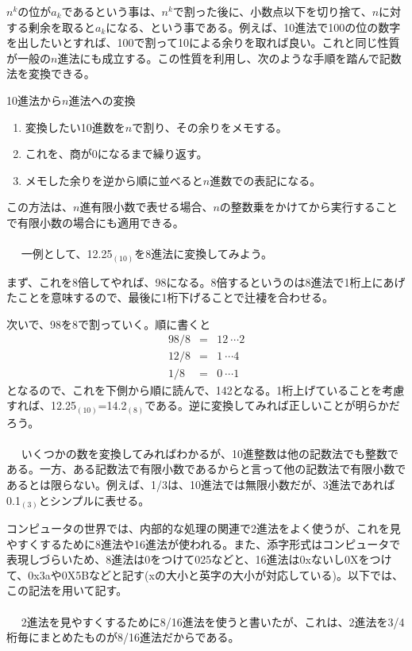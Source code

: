 $n^k$の位が$a_k$であるという事は、$n^k$で割った後に、小数点以下を切り捨て、$n$に対する剰余を取ると$a_k$になる、という事である。例えば、10進法で100の位の数字を出したいとすれば、100で割って10による余りを取れば良い。これと同じ性質が一般の$n$進法にも成立する。この性質を利用し、次のような手順を踏んで記数法を変換できる。
\begin{itembox}[l]{10進法から$n$進法への変換}
\begin{enumerate}
\item 変換したい10進数を$n$で割り、その余りをメモする。
\item これを、商が0になるまで繰り返す。
\item メモした余りを逆から順に並べると$n$進数での表記になる。
\end{enumerate}
\end{itembox}

この方法は、$n$進有限小数で表せる場合、$n$の整数乗をかけてから実行することで有限小数の場合にも適用できる。
\\ \\　
一例として、12.25$_{(10)}$を8進法に変換してみよう。

まず、これを8倍してやれば、98になる。8倍するというのは8進法で1桁上にあげたことを意味するので、最後に1桁下げることで辻褄を合わせる。

次いで、98を8で割っていく。順に書くと
\begin{eqnarray*}
98/8&=&12\ \cdots 2\\
12/8&=&1\ \cdots 4\\
1/8&=&0\ \cdots 1
\end{eqnarray*}
となるので、これを下側から順に読んで、142となる。1桁上げていることを考慮すれば、12.25$_{(10)}$=14.2$_{(8)}$である。逆に変換してみれば正しいことが明らかだろう。
\\ \\　
いくつかの数を変換してみればわかるが、10進整数は他の記数法でも整数である。一方、ある記数法で有限小数であるからと言って他の記数法で有限小数であるとは限らない。例えば、1/3は、10進法では無限小数だが、3進法であれば0.1$_{(3)}$とシンプルに表せる。

コンピュータの世界では、内部的な処理の関連で2進法をよく使うが、これを見やすくするために8進法や16進法が使われる。また、添字形式はコンピュータで表現しづらいため、8進法は0をつけて025などと、16進法は0xないし0Xをつけて、0x3aや0X5Bなどと記す(xの大小と英字の大小が対応している)。以下では、この記法を用いて記す。
\\ \\　
2進法を見やすくするために8/16進法を使うと書いたが、これは、2進法を3/4桁毎にまとめたものが8/16進法だからである。


